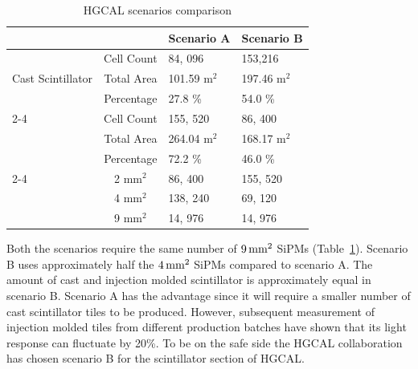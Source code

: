 \begin{table}[!ht]
  \centering
  \caption{\gls{HGCAL} scenarios comparison}\label{tab:scenarios}
  \begin{tabular}{p{1.5in}cll}%
    \toprule
                                                   &                    & Scenario A             & Scenario B             \\
    \midrule
    \multirow{3}{=}{Cast Scintillator}             & Cell Count         & 84, 096                & 153,216                \\
                                                   & Total Area         & 101.59 \(\text{m}^2 \) & 197.46 \(\text{m}^2 \) \\
                                                   & Percentage         & 27.8 \%                & 54.0 \%                \\
    \cmidrule(lr){2-4}
    \multirow{3}{=}{Injection Molded Scintillator} & Cell Count         & 155, 520               & 86, 400                \\
                                                   & Total Area         & 264.04 \(\text{m}^2 \) & 168.17 \(\text{m}^2 \) \\
                                                   & Percentage         & 72.2 \%                & 46.0 \%                \\
    \cmidrule(lr){2-4}
    \multirow{2}{=}{SiPMs Count}                   & 2 \(\text{mm}^2 \) & 86, 400                & 155, 520               \\
                                                   & 4 \(\text{mm}^2 \) & 138, 240               & 69, 120                \\
                                                   & 9 \(\text{mm}^2 \) & 14, 976                & 14, 976                \\
    \bottomrule
  \end{tabular}
\end{table}


Both the scenarios require the same number of \(9 \,\text{mm}{}^{2}\) \glspl{SiPM} (Table~\ref{tab:scenarios}).
Scenario B uses approximately half the \(4 \,\text{mm}{}^{2}\) \glspl{SiPM}
compared to scenario A. The amount of cast and injection molded
scintillator is approximately equal in scenario B.
Scenario A has the advantage since it will require
a smaller number of cast scintillator tiles to be produced.
However, subsequent measurement of injection
molded tiles from different production batches have shown
that its light response can fluctuate by 20\%.
To be on the safe side the \gls{HGCAL} collaboration has chosen
scenario B for the scintillator section of \gls{HGCAL}.